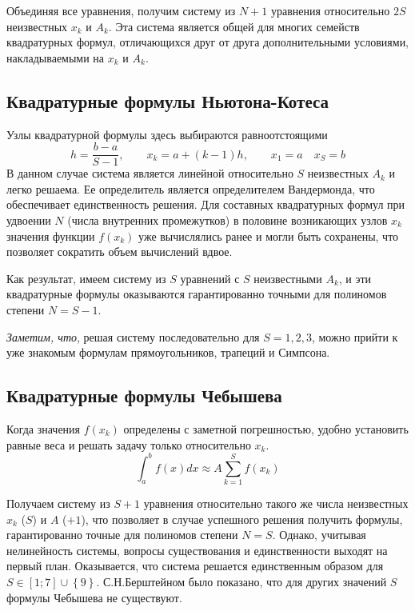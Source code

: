 Объединяя все уравнения, получим систему из $N+1$ уравнения относительно $2S$ неизвестных $x_k$ и $A_k$. Эта система
является общей для многих семейств квадратурных формул, отличающихся друг от друга дополнительными условиями,
накладываемыми на $x_k$ и $A_k$.

\subsection{Квадратурные формулы Ньютона-Котеса}
Узлы квадратурной формулы здесь выбираются равноотстоящими
\begin{equation*}
    h=\frac{b-a}{S-1}, \qquad x_k = a + (k-1)h, \qquad x_1 = a \quad x_S = b
\end{equation*}
В данном случае система является линейной относительно $S$ неизвестных $A_k$ и легко решаема. Ее определитель является
определителем Вандермонда, что обеспечивает единственность решения. Для составных квадратурных формул при удвоении $N$
(числа внутренних промежутков) в половине возникающих узлов $x_k$ значения функции $f(x_k)$ уже вычислялись ранее и могли
быть сохранены, что позволяет сократить объем вычислений вдвое.

Как результат, имеем систему из $S$ уравнений с $S$ неизвестными $A_k$, и эти квадратурные формулы оказываются
гарантированно точными для полиномов степени $N = S - 1$.

\emph{Заметим, что}, решая систему последовательно для $S = 1, 2, 3$, можно прийти к уже знакомым формулам
прямоугольников, трапеций и Симпсона.

\subsection{Квадратурные формулы Чебышева}
Когда значения $f(x_k)$ определены с заметной погрешностью, удобно установить равные веса и решать задачу только
относительно $x_k$.
\begin{equation*}
    \int_{a}^{b} f(x)dx \approx A \sum_{k=1}^{S} f(x_k)
\end{equation*}

Получаем систему из $S + 1$ уравнения относительно такого же числа неизвестных $x_k$ ($S$) и $A$ ($+1$), что позволяет в
случае успешного решения получить формулы, гарантированно точные для полиномов степени $N = S$. Однако, учитывая
нелинейность системы, вопросы существования и единственности выходят на первый план. Оказывается, что система решается
единственным образом для $S \in [1; 7] \cup \left\{ 9 \right\} $. С.Н.Берштейном было показано, что для других значений $S$
формулы Чебышева не существуют.


